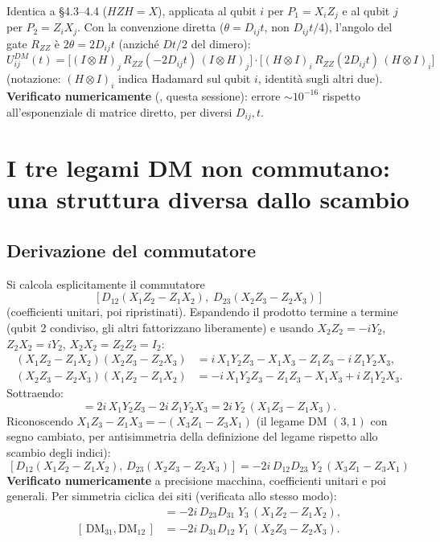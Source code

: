 \documentclass[11pt,a4paper]{article}
\begin{document}
Identica a \texttt{} \S4.3--4.4 ($HZH=X$), applicata al qubit $i$ per $P_1=X_iZ_j$ e al qubit $j$ per $P_2=Z_iX_j$. Con la convenzione diretta ($\theta=D_{ij}t$, non $D_{ij}t/4$), l'angolo del gate $R_{ZZ}$ è $2\theta=2D_{ij}t$ (anziché $Dt/2$ del dimero):
\begin{equation}
\boxed{U_{ij}^{DM}(t) = \big[(I\otimes H)_j\,R_{ZZ}(-2D_{ij}t)\,(I\otimes H)_j\big]\cdot\big[(H\otimes I)_i\,R_{ZZ}(2D_{ij}t)\,(H\otimes I)_i\big]}
\label{eq:UDM-bond}
\end{equation}
(notazione: $(H\otimes I)_i$ indica Hadamard sul qubit $i$, identità sugli altri due). \textbf{Verificato numericamente} (\texttt{}, questa sessione): errore $\sim10^{-16}$ rispetto all'esponenziale di matrice diretto, per diversi $D_{ij},t$.

\section{I tre legami DM non commutano: una struttura diversa dallo scambio}
\label{sec:DM-noncomm}

\subsection{Derivazione del commutatore}

Si calcola esplicitamente il commutatore
\begin{equation*}
\big[\,D_{12}(X_1Z_2{-}Z_1X_2),\;D_{23}(X_2Z_3{-}Z_2X_3)\,\big]
\end{equation*}
(coefficienti unitari, poi ripristinati). Espandendo il prodotto termine a termine (qubit 2 condiviso, gli altri fattorizzano liberamente) e usando $X_2Z_2=-iY_2$, $Z_2X_2=iY_2$, $X_2X_2=Z_2Z_2=I_2$:
\begin{align}
(X_1Z_2{-}Z_1X_2)(X_2Z_3{-}Z_2X_3) &= i\,X_1Y_2Z_3 - X_1X_3 - Z_1Z_3 - i\,Z_1Y_2X_3,\\
(X_2Z_3{-}Z_2X_3)(X_1Z_2{-}Z_1X_2) &= -i\,X_1Y_2Z_3 - Z_1Z_3 - X_1X_3 + i\,Z_1Y_2X_3.
\end{align}
Sottraendo:
\begin{equation}
[X_1Z_2{-}Z_1X_2,\,X_2Z_3{-}Z_2X_3] = 2i\,X_1Y_2Z_3 - 2i\,Z_1Y_2X_3 = 2i\,Y_2\,(X_1Z_3-Z_1X_3).
\end{equation}
Riconoscendo $X_1Z_3-Z_1X_3 = -(X_3Z_1-Z_3X_1)$ (il legame DM $(3,1)$ con segno cambiato, per antisimmetria della definizione del legame rispetto allo scambio degli indici):
\begin{equation}
\boxed{[D_{12}(X_1Z_2{-}Z_1X_2),\,D_{23}(X_2Z_3{-}Z_2X_3)] = -2i\,D_{12}D_{23}\;Y_2\,(X_3Z_1-Z_3X_1)}
\label{eq:DM-comm}
\end{equation}
\textbf{Verificato numericamente} a precisione macchina, coefficienti unitari e poi generali. Per simmetria ciclica dei siti (verificata allo stesso modo):
\begin{align}
[\,\text{DM}_{23},\text{DM}_{31}\,] &= -2i\,D_{23}D_{31}\;Y_3\,(X_1Z_2-Z_1X_2),\\
[\,\text{DM}_{31},\text{DM}_{12}\,] &= -2i\,D_{31}D_{12}\;Y_1\,(X_2Z_3-Z_2X_3).
\label{eq:DM-comm-cyclic}
\end{align}
\end{document}
